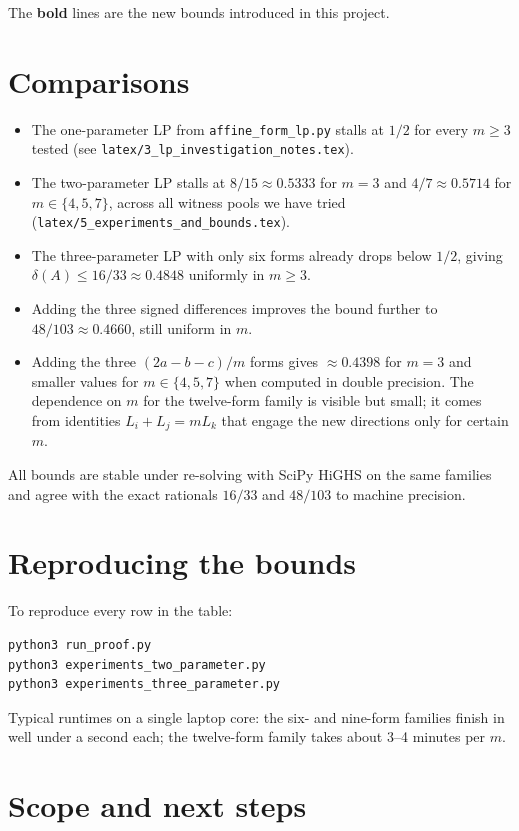 \documentclass[11pt]{article}
\begin{document}
\medskip

The \textbf{bold} lines are the new bounds introduced in this project.

\section{Comparisons}

\begin{itemize}
\item The one-parameter LP from \texttt{affine\_form\_lp.py} stalls at $1/2$
for every $m\ge 3$ tested (see \texttt{latex/3\_lp\_investigation\_notes.tex}).
\item The two-parameter LP stalls at $8/15\approx 0.5333$ for $m=3$ and
$4/7\approx 0.5714$ for $m\in\{4,5,7\}$, across all witness pools we have tried
(\texttt{latex/5\_experiments\_and\_bounds.tex}).
\item The three-parameter LP with only six forms already drops below $1/2$,
giving $\delta(A)\le 16/33\approx 0.4848$ uniformly in $m\ge 3$.
\item Adding the three signed differences improves the bound further to
$48/103\approx 0.4660$, still uniform in $m$.
\item Adding the three $(2a-b-c)/m$ forms gives $\approx 0.4398$ for $m=3$ and
smaller values for $m\in\{4,5,7\}$ when computed in double precision. The
dependence on $m$ for the twelve-form family is visible but small; it comes
from identities $L_i+L_j=mL_k$ that engage the new directions only for certain
$m$.
\end{itemize}

All bounds are stable under re-solving with SciPy HiGHS on the same families
and agree with the exact rationals $16/33$ and $48/103$ to machine precision.

\section{Reproducing the bounds}

To reproduce every row in the table:
\begin{verbatim}
python3 run_proof.py
python3 experiments_two_parameter.py
python3 experiments_three_parameter.py
\end{verbatim}

Typical runtimes on a single laptop core: the six- and nine-form families
finish in well under a second each; the twelve-form family takes about
3--4 minutes per $m$.

\section{Scope and next steps}
\end{document}
